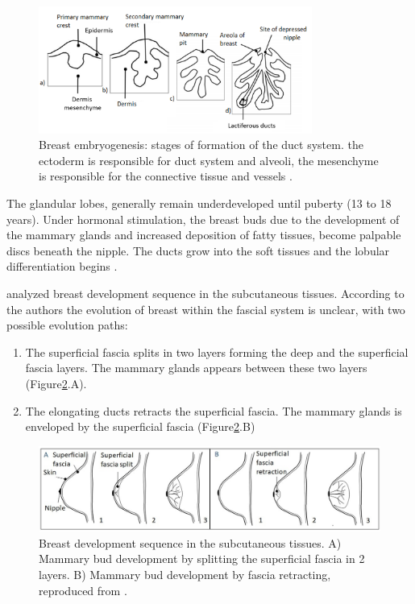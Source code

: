  \begin{figure}[!h]
 \centering
\includegraphics[width=0.8\textwidth,keepaspectratio]{figures/breast_evolution_my.png} 
\caption[Breast embryogenesis] {Breast embryogenesis: stages of formation of the duct system. the ectoderm is responsible for duct system and alveoli, the mesenchyme is responsible for the connective tissue and vessels \citep{skandalakis_embryology_2009}.}
\label{breastembryogenesis}
\end{figure}


The glandular lobes, generally remain underdeveloped until puberty (13 to 18 years). Under hormonal stimulation, the breast buds due to the development of the mammary glands and increased deposition of fatty tissues, become palpable discs beneath the nipple. The ducts grow into the soft tissues and the lobular differentiation begins \citep{kopans2007breast}. 

\cite{kopans2007breast} analyzed breast development sequence in the subcutaneous tissues. According to the authors the evolution of breast within the fascial system is unclear, with two possible evolution paths: 
\begin{enumerate}[label=(\Alph*)]
\item The superficial fascia splits in two layers forming the deep and the superficial fascia layers. The mammary glands appears between these two layers (Figure\ref{breastevol_fascia}.A).
\item The elongating ducts retracts the superficial fascia.  The mammary glands is enveloped by the superficial fascia (Figure\ref{breastevol_fascia}.B)
\end{enumerate}

\begin{figure}[!h]
\centering
\includegraphics[width=0.9\linewidth,keepaspectratio]{figures/breastEvol_fascia_my.jpg} 
\caption[Breast development sequence into subcutaneous tissues.]{Breast development sequence in the subcutaneous tissues. A) Mammary bud development by splitting the superficial fascia in 2 layers. B) Mammary bud development by fascia retracting, reproduced from  \citep{kopans2007breast}. }
\label{breastevol_fascia}
\end{figure}


